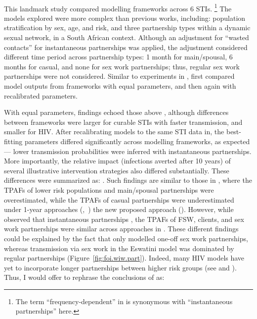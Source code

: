 \paragraph{\citet{Johnson2016a}}
This landmark study compared modelling frameworks across 6 STIs.%
\footnote{The term ``frequency-dependent'' in \cite{Johnson2016a} is synonymous with
  ``instantaneous partnerships'' here.}
The models explored were more complex than previous works, including:
population stratification by sex, age, and risk,
and three partnership types within a dynamic sexual network, in a South African context.
Although an adjustment for ``wasted contacts'' for instantaneous partnerships was applied,
the adjustment considered different time period across partnership types:
1 month for main/spousal, 6 months for casual, and none for sex work partnerships;
thus, regular sex work partnerships were not considered.
Similar to experiments in , \cite{Johnson2016a} first compared
model outputs from frameworks with equal parameters, and then again with recalibrated parameters.
\par
With equal parameters, findings echoed those above \cite{Eames2002,Lloyd-Smith2004},
although differences between frameworks were larger for
curable STIs with faster transmission, and smaller for HIV.
After recalibrating models to the same STI data in,
the best-fitting parameters differed significantly across modelling frameworks, as expected
--- \eg lower transmission probabilities were inferred with instantaneous partnerships.
More importantly, the relative impact (infections averted after 10 years)
of several illustrative intervention strategies also differed substantially.
These differences were summarized as:
 \cite{Johnson2016a}.
Such findings are similar to those in , where
the TPAFs of lower risk populations and main/spousal partnerships were overestimated, while
the TPAFs of casual partnerships were underestimated
under 1-year approaches (\ry,~\py) \vs the new proposed approach (\np).
However, while \cite{Johnson2016a} observed that instantaneous partnerships
,
the TPAFs of FSW, clients, and sex work partnerships
were similar across approaches in .
These different findings could be explained by the fact that
\cite{Johnson2016a} only modelled one-off sex work partnerships,
whereas transmission via sex work in the Eswatini model
was dominated by regular partnerships (Figure~\ref{fig:foi.wiw.part}).
Indeed, many HIV models have yet to incorporate longer partnerships between higher risk groups
(see  and ).
Thus, I would offer to rephrase the conclusions of \cite{Johnson2016a} as:
